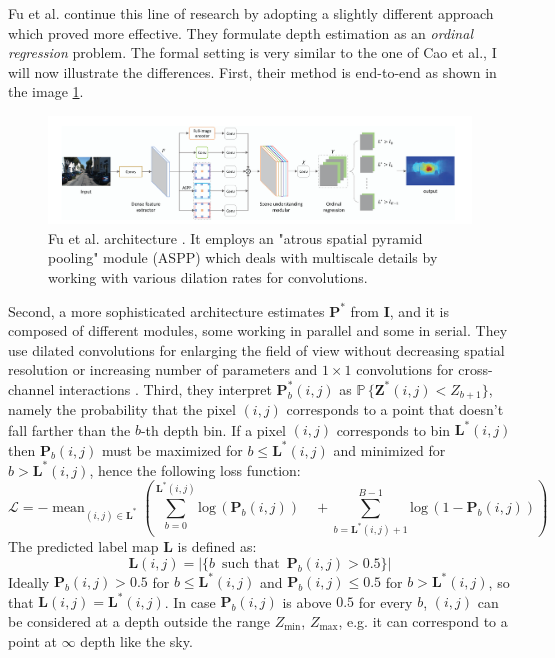 \newpage
Fu et al. \cite{ordinal_regression} continue this line of research by adopting a slightly different approach which proved more effective.
They formulate depth estimation as an \textit{ordinal regression} problem.
The formal setting is very similar to the one of Cao et al., I will now illustrate the differences.
First, their method is end-to-end as shown in the image \ref{fig:Fu_ordinal}.

\begin{figure}
	\centering
	\includegraphics[scale=0.35]{figs/Fu_ordinal}
	\caption{Fu et al. architecture \cite{ordinal_regression}. It employs an "atrous spatial pyramid pooling" module (ASPP) which deals with multiscale details by working with various dilation rates for convolutions. \label{fig:Fu_ordinal}}
\end{figure}

Second, a more sophisticated architecture estimates $\mathbf{P}^{*}$ from $\mathbf{I}$, and it is composed of different modules, some working in parallel and some in serial.
They use dilated convolutions for enlarging the field of view without decreasing spatial resolution or increasing number of parameters \cite{ordinal_regression} and $1 \times 1$ convolutions for cross-channel interactions \cite{ordinal_regression}.
Third, they interpret $\mathbf{P}^{*}_{b}(i, j)$ as $\mathbb{P} \, \{ \mathbf{Z}^{*}(i, j) < Z_{b+1} \}$, namely the probability that the pixel $(i, j)$ corresponds to a point that doesn't fall farther than the $b$-th depth bin.
If a pixel $(i, j)$ corresponds to bin $\mathbf{L}^{*}(i, j)$ then $\mathbf{P}_{b}(i, j)$ must be maximized for $b \leq \mathbf{L}^{*}(i, j)$ and minimized for $b > \mathbf{L}^{*}(i, j)$, hence the following loss function:
\[
	\mathcal{L} = - \mathop{\text{mean}}_{(i, j) \in \mathbf{L}^{*}}
	\left(
		\sum_{b=0}^{\mathbf{L}^{*}(i, j)} \text{log} \,( \mathbf{P}_{b}(i, j)) \quad +
		\sum_{b=\mathbf{L}^{*}(i, j) + 1}^{B-1} \text{log} \, (1 - \mathbf{P}_{b}(i, j))
	\right)
\]
The predicted label map $\mathbf{L}$ is defined as:
\[
	\mathbf{L}(i, j) = | \{b \, \text{ such that } \, \mathbf{P}_{b}(i, j) > 0.5\} |
\]
Ideally $\mathbf{P}_{b}(i, j) > 0.5$ for $b \leq \mathbf{L}^{*}(i, j)$ and $\mathbf{P}_{b}(i, j) \leq 0.5$ for $b > \mathbf{L}^{*}(i, j)$, so that $\mathbf{L}(i, j) = \mathbf{L}^{*}(i, j)$.
In case $\mathbf{P}_{b}(i, j)$ is above $0.5$ for every $b$, $(i, j)$ can be considered at a depth outside the range $Z_{\text{min}}$, $Z_{\text{max}}$, e.g. it can correspond to a point at $\infty$ depth like the sky.


